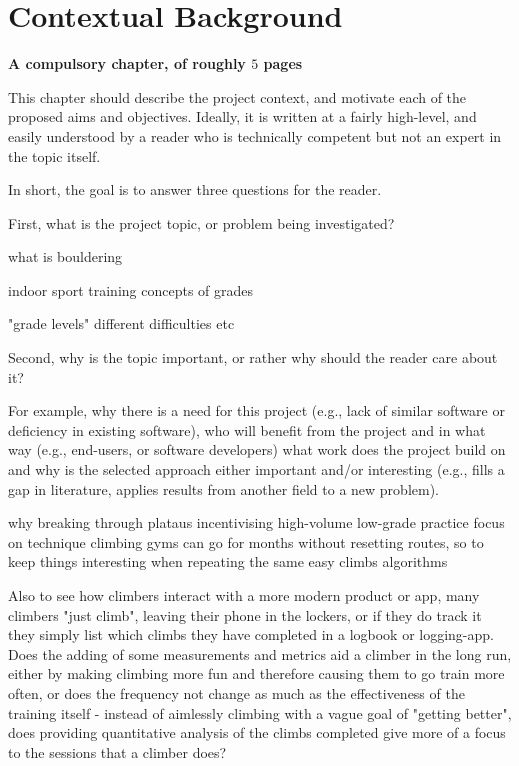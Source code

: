 \chapter{Contextual Background}
\label{chap:context}

{\bf A compulsory chapter,     of roughly $5$ pages}
\vspace{1cm}

\noindent
This chapter should describe the project context, and motivate each of
the proposed aims and objectives.  Ideally, it is written at a fairly
high-level, and easily understood by a reader who is technically
competent but not an expert in the topic itself.

In short, the goal is to answer three questions for the reader.

First, what is the project topic, or problem being investigated?

what is bouldering

indoor sport
training
concepts of grades

"grade levels"
different difficulties etc




Second, why is the topic important, or rather why should the reader care about it?

For example, why there is a need for this project (e.g., lack of similar software or deficiency in existing software), who will benefit from the project and in what way (e.g., end-users, or software developers) what work does the project build on and why is the selected approach either
important and/or interesting (e.g., fills a gap in literature, applies results from another field to a new problem).

why
breaking through plataus
incentivising high-volume low-grade practice
focus on technique
climbing gyms can go for months without resetting routes, so to keep things interesting when repeating the same easy climbs algorithms

Also to see how climbers interact with a more modern product or app,
many climbers "just climb", leaving their phone in the lockers,
or if they do track it they simply list which climbs they have completed in a logbook or logging-app.
Does the adding of some measurements and metrics aid a climber in the long run,
either by making climbing more fun and therefore causing them to go train more often, or does the frequency not change as much as the effectiveness of the training itself - instead of aimlessly climbing with a vague goal of "getting better", does providing quantitative analysis of the climbs completed give more of a focus to the sessions that a climber does?







